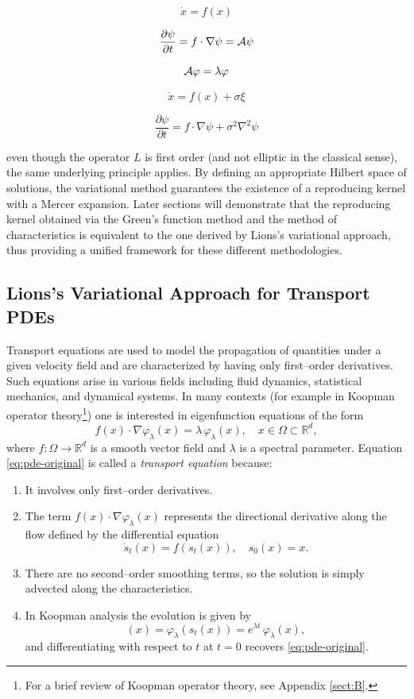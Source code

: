 \documentclass[11pt]{article}
\theoremstyle{plain}
\def\[{\begin{equation}}
\def\]{\end{equation}}
\begin{document}
{\color{red}
\[\dot x=f(x)\]

\[\frac{\partial \psi}{\partial t}=f\cdot\nabla \psi={\cal A}\psi\]


\[{\cal A}\varphi=\lambda\varphi\]

\[\dot x=f(x)+\sigma \xi\]

\[\frac{\partial \psi}{\partial t}=f\cdot \nabla \psi+\sigma^2 \nabla^2 \psi\]
}
even though the operator \(L\) is first order (and not elliptic in the classical sense), the same underlying principle applies. By defining an appropriate Hilbert space of solutions, the variational method guarantees the existence of a reproducing kernel with a Mercer expansion. Later sections will demonstrate that the reproducing kernel obtained via the Green’s function method and the method of characteristics is equivalent to the one derived by Lions’s variational approach, thus providing a unified framework for these different methodologies.



\subsection{Lions's Variational Approach for Transport PDEs}


Transport equations are used to model the propagation of quantities under a given velocity field and are characterized by having only first--order derivatives. Such equations arise in various fields including fluid dynamics, statistical mechanics, and dynamical systems. In many contexts (for example in Koopman operator theory\footnote{For a brief review of Koopman operator theory, see Appendix \ref{sect:B}.}) one is interested in eigenfunction equations of the form
\begin{equation}
\label{eq:pde-original}
f(x)\cdot \nabla \varphi_\lambda(x)=\lambda\, \varphi_\lambda(x),\quad x\in\Omega\subset \mathbb{R}^d,
\end{equation}
where \(f:\Omega\to\mathbb{R}^d\) is a smooth vector field and \(\lambda\) is a spectral parameter. Equation \eqref{eq:pde-original} is called a \emph{transport equation} because:
\begin{enumerate}
  \item It involves only first--order derivatives.
  \item The term \(f(x)\cdot \nabla \varphi_\lambda(x)\) represents the directional derivative along the flow defined by the differential equation
    \[
    \dot{s}_t(x)=f(s_t(x)),\quad s_0(x)=x.
    \]
  \item There are no second--order smoothing terms, so the solution is simply advected along the characteristics.
  \item In Koopman analysis the evolution is given by 
    \[
    [U_t \varphi_\lambda](x)=\varphi_\lambda(s_t(x))=e^{\lambda t}\,\varphi_\lambda(x),
    \]
    and differentiating with respect to \(t\) at \(t=0\) recovers \eqref{eq:pde-original}.
\end{enumerate}
\end{document}
